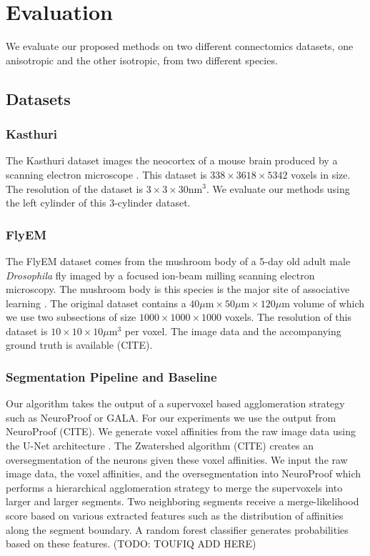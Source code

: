 \section{Evaluation}

We evaluate our proposed methods on two different connectomics datasets, one anisotropic and the other isotropic, from two different species. 

\subsection{Datasets}
\label{sec:dataset}
\subsubsection{Kasthuri}
The Kasthuri dataset images the neocortex of a mouse brain produced by a scanning electron microscope \cite{kasthuri2015saturated}. 
This dataset is $338 \times 3618 \times  5342$ voxels in size. 
The resolution of the dataset is $3 \times 3 \times 30 \textrm{nm}^3$. 
We evaluate our methods using the left cylinder of this 3-cylinder dataset. 

\subsubsection{FlyEM}

The FlyEM dataset comes from the mushroom body of a 5-day old adult male \textit{Drosophila} fly imaged by a focused ion-beam milling scanning electron microscopy.  
The mushroom body is this species is the major site of associative learning \cite{takemura2017connectome}. 
The original dataset contains a $40 \mu\textrm{m} \times 50\mu\textrm{m} \times 120\mu\textrm{m}$ volume of which we use two subsections of size $1000 \times 1000 \times 1000$ voxels.  
The resolution of this dataset is $10 \times 10 \times 10 \mu\textrm{m}^3$ per voxel. 
The image data and the accompanying ground truth is available (CITE). 

\subsubsection{Segmentation Pipeline and Baseline}
\label{sec:neuroproof}
Our algorithm takes the output of a supervoxel based agglomeration strategy such as NeuroProof or GALA. For our experiments we use the output from NeuroProof (CITE). We generate voxel affinities from the raw image data using the U-Net architecture \cite{ronneberger2015u}. The Zwatershed algorithm (CITE) creates an oversegmentation of the neurons given these voxel affinities. We input the raw image data, the voxel affinities, and the oversegmentation into NeuroProof which performs a hierarchical agglomeration strategy to merge the supervoxels into larger and larger segments. Two neighboring segments receive a merge-likelihood score based on various extracted features such as the distribution of affinities along the segment boundary. A random forest classifier generates probabilities based on these features. (TODO: TOUFIQ ADD HERE)



